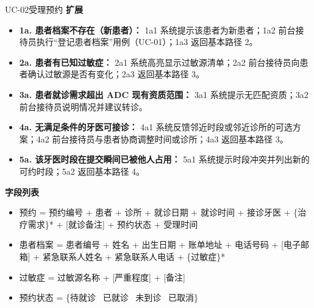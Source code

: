 \documentclass[11pt,a4paper]{ctexart}
\begin{document}
\begin{ucbox}{UC-02\quad 受理预约}
\vspace{2pt}
\textbf{扩展}
\begin{itemize}[leftmargin=1.4em,topsep=2pt,itemsep=1pt]
  \item \textbf{1a. 患者档案不存在（新患者）：} 1a1 系统提示该患者为新患者；1a2 前台接待员执行“登记患者档案”用例（UC-01）；1a3 返回基本路径 2。
  \item \textbf{2a. 患者有已知过敏症：} 2a1 系统高亮显示过敏源清单；2a2 前台接待员向患者确认过敏源是否有变化；2a3 返回基本路径 3。
  \item \textbf{3a. 患者就诊需求超出 ADC 现有资质范围：} 3a1 系统提示无匹配资质；3a2 前台接待员说明情况并建议转诊。
  \item \textbf{4a. 无满足条件的牙医可接诊：} 4a1 系统反馈邻近时段或邻近诊所的可选方案；4a2 前台接待员与患者协商调整时间或诊所；4a3 返回基本路径 3。
  \item \textbf{5a. 该牙医时段在提交瞬间已被他人占用：} 5a1 系统提示时段冲突并列出新的可约时段；5a2 返回基本路径 4。
\end{itemize}

\vspace{2pt}
\textbf{字段列表}
\begin{itemize}[leftmargin=1.4em,topsep=2pt,itemsep=1pt]
  \item 预约 = 预约编号 + 患者 + 诊所 + 就诊日期 + 就诊时间 + 接诊牙医 + \{治疗需求\}* + [就诊备注] + 预约状态 + 受理时间
  \item 患者档案 = 患者编号 + 姓名 + 出生日期 + 账单地址 + 电话号码 + [电子邮箱] + 紧急联系人姓名 + 紧急联系人电话 + \{过敏症\}*
  \item 过敏症 = 过敏源名称 + [严重程度] + [备注]
  \item 预约状态 = \{待就诊 \textbar\ 已就诊 \textbar\ 未到诊 \textbar\ 已取消\}
\end{itemize}


\end{ucbox}
\end{document}
